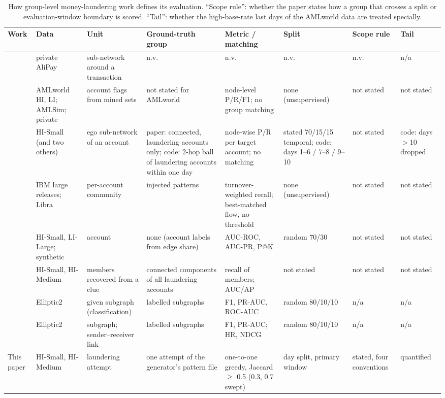 \begin{table}[t]
\centering
\small
\caption{How group-level money-laundering work defines its evaluation. ``Scope rule'': whether
the paper states how a group that crosses a split or evaluation-window boundary is scored.
``Tail'': whether the high-base-rate last days of the AMLworld data are treated specially.}
\label{tab:related-comparison}
\begin{tabular}{@{}p{2.3cm}p{1.7cm}p{2.0cm}p{3.1cm}p{2.8cm}p{2.1cm}p{1.2cm}p{1.2cm}@{}}
\toprule
Work & Data & Unit & Ground-truth group & Metric / matching & Split & Scope rule & Tail \\
\midrule
\citet{chai2023} & private AliPay & sub-network around a transaction & n.v. & n.v. & n.v. & n.v. & n/a \\
\citet{tian2025} & AMLworld HI, LI; AMLSim; private & account flags from mined sets & not stated for AMLworld & node-level P/R/F1; no group matching & none (unsupervised) & not stated & not stated \\
\citet{rico2026} & HI-Small (and two others) & ego sub-network of an account & paper: connected, laundering accounts only; code: 2-hop ball of laundering accounts within one day & node-wise P/R per target account; no matching & stated 70/15/15 temporal; code: days 1--6 / 7--8 / 9--10 & not stated & code: days $>$10 dropped \\
\citet{tariq2026redirect} & IBM large releases; Libra & per-account community & injected patterns & turnover-weighted recall; best-matched flow, no threshold & none (unsupervised) & not stated & not stated \\
\citet{deprez2025garg} & HI-Small, LI-Large; synthetic & account & none (account labels from edge share) & AUC-ROC, AUC-PR, P@K & random 70/30 & not stated & not stated \\
\citet{wang2026clue} & HI-Small, HI-Medium & members recovered from a clue & connected components of all laundering accounts & recall of members; AUC/AP & not stated & not stated & not stated \\
\citet{bellei2024} & Elliptic2 & given subgraph (classification) & labelled subgraphs & F1, PR-AUC, ROC-AUC & random 80/10/10 & n/a & n/a \\
\citet{song2024revtrack} & Elliptic2 & subgraph; sender--receiver link & labelled subgraphs & F1, PR-AUC; HR, NDCG & random 80/10/10 & n/a & n/a \\
\midrule
This paper & HI-Small, HI-Medium & laundering attempt & one attempt of the generator's pattern file & one-to-one greedy, Jaccard $\ge$ 0.5 (0.3, 0.7 swept) & day split, primary window & stated, four conventions & quantified \\
\bottomrule
\end{tabular}
\end{table}
